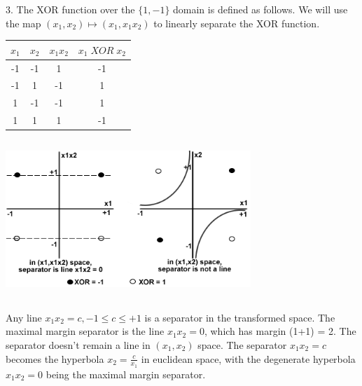 \documentclass[11pt]{article}
\begin{document}
3. The XOR function over the $\{1,-1\}$ domain is defined as follows. We will use the map
$(x_1,x_2) \mapsto (x_1,x_1x_2)$ to linearly separate the XOR function.

\begin{center}
\begin{tabular}{|c|c|c|c|}
\hline
$x_1$ & $x_2$ & $x_1x_2$ & $x_1 \;XOR\; x_2$ \\
\hline
-1  & -1	&  1		 & -1 \\
-1  &  1	& -1		 &  1 \\
1   & -1	& -1		 &  1 \\
1   &  1	&  1		 & -1 \\
\hline
\end{tabular}
\end{center}

\begin{center} \includegraphics[width=350px,height=225px]{3.png} \end{center}

Any line $x_1x_2 = c, -1 \leq c \leq +1$ is a separator in the transformed space.
The maximal margin separator is the line $x_1x_2 = 0$, which has margin (1+1) = 2.
The separator doesn't remain a line in $(x_1,x_2)$ space. The separator $x_1x_2 = c$
becomes the hyperbola $x_2 = \frac{c}{x_1}$ in euclidean space, with the degenerate
hyperbola $x_1x_2 = 0$ being the maximal margin separator.

\renewcommand{\labelenumi}{\arabic{enumi}.}
\renewcommand{\labelenumii}{[\alph{enumii}]}
\end{document}
